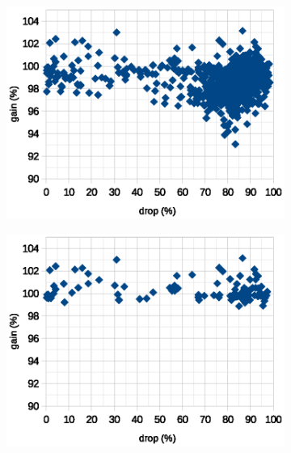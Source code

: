 \documentclass[12pt]{report}
\begin{document}
\newpage
\begin{figure}[h!]
	\centering
	\begin{subfigure}[b]{0.49\linewidth}
		\centering
		\includegraphics[scale=0.7]{dia/all_all.eps}
	\end{subfigure}
	\begin{subfigure}[b]{0.49\linewidth}
		\centering
		\includegraphics[scale=0.7]{dia/best_all.eps}
	\end{subfigure}
	\caption{Plot from all layers}
	\label{all_layer}
	\begin{subfigure}[b]{0.49\linewidth}
		\centering

\end{subfigure}
\end{figure}
\end{document}
